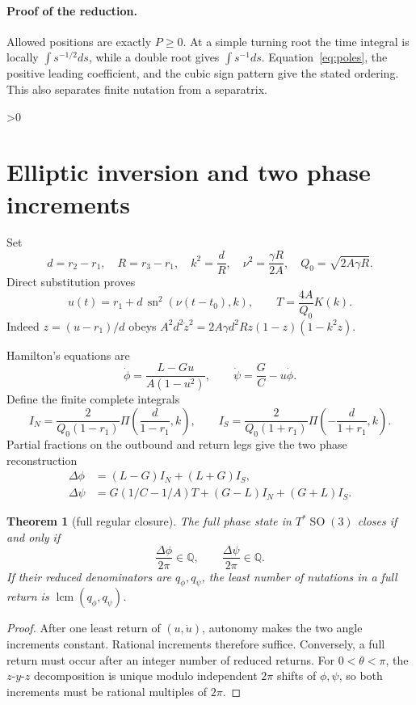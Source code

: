 \documentclass[10pt]{article}
\providecommand{\CRevisionRound}{2}
\newtheorem{theorem}{Theorem}
\newcommand{\Q}{\mathbb Q}
\newcommand{\sn}{\operatorname{sn}}
\newcommand{\SO}{\operatorname{SO}}
\begin{document}
\paragraph{Proof of the reduction.}
Allowed positions are exactly \(P\geq0\).  At a simple turning root the time
integral is locally \(\int s^{-1/2}ds\), while a double root gives
\(\int s^{-1}ds\).  Equation~\eqref{eq:poles}, the positive leading
coefficient, and the cubic sign pattern give the stated ordering.  This also
separates finite nutation from a separatrix.

\ifnum\CRevisionRound>0
\section{Elliptic inversion and two phase increments}
Set
\[
 d=r_2-r_1,\quad R=r_3-r_1,\quad
 k^2=\frac{d}{R},\quad \nu^2=\frac{\gamma R}{2A},\quad
 Q_0=\sqrt{2A\gamma R}.
\]
Direct substitution proves
\begin{equation}
 u(t)=r_1+d\,\sn^2(\nu(t-t_0),k),\qquad
 T=\frac{4A}{Q_0}K(k).                                          \label{eq:sn}
\end{equation}
Indeed \(z=(u-r_1)/d\) obeys
\(A^2d^2\dot z^2=2A\gamma d^2Rz(1-z)(1-k^2z)\).

Hamilton's equations are
\[
\dot\phi=\frac{L-Gu}{A(1-u^2)},\qquad
\dot\psi=\frac{G}{C}-u\dot\phi .
\]
Define the finite complete integrals
\[
 I_N=\frac{2}{Q_0(1-r_1)}
 \Pi\left(\frac{d}{1-r_1},k\right),\qquad
 I_S=\frac{2}{Q_0(1+r_1)}
 \Pi\left(-\frac{d}{1+r_1},k\right).
\]
Partial fractions on the outbound and return legs give the two phase
reconstruction
\begin{align}
 \Delta\phi&=(L-G)I_N+(L+G)I_S,                                 \label{eq:dphi}\\
 \Delta\psi&=G(1/C-1/A)T+(G-L)I_N+(G+L)I_S.                    \label{eq:dpsi}
\end{align}

\begin{theorem}[full regular closure]\label{thm:closure}
The full phase state in \(T^*\SO(3)\) closes if and only if
\[
 \frac{\Delta\phi}{2\pi}\in\Q,\qquad
 \frac{\Delta\psi}{2\pi}\in\Q.
\]
If their reduced denominators are \(q_\phi,q_\psi\), the least number of
nutations in a full return is \(\operatorname{lcm}(q_\phi,q_\psi)\).
\end{theorem}
\begin{proof}
After one least return of \((u,\dot u)\), autonomy makes the two angle
increments constant.  Rational increments therefore suffice.  Conversely, a
full return must occur after an integer number of reduced returns.  For
\(0<\theta<\pi\), the \(z\)-\(y\)-\(z\) decomposition is unique modulo
independent \(2\pi\) shifts of \(\phi,\psi\), so both increments must be
rational multiples of \(2\pi\).
\end{proof}
\fi
\end{document}
